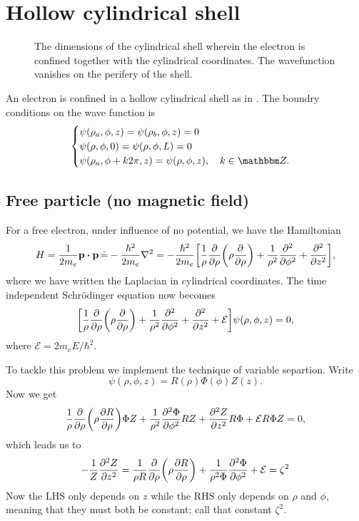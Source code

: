 \documentclass[11pt,letter, swedish, english
]{article}
\begin{document}
\section{Hollow cylindrical shell}
\newcommand{\E}{\ensuremath{\mathcal{E}}}

\begin{figure}\centering
\resizebox{.3\textwidth}{!}{}
\caption{The dimensions of the cylindrical shell wherein the electron
  is confined together with the cylindrical coordinates. The
  wavefunction vanishes on the perifery of the shell.}
\label{fig:cylinder}
\end{figure}

An electron is confined in a hollow cylindrical shell as in
. The boundry conditions on the wave function is
\begin{equation}
\begin{cases}
\psi(\rho_a, \phi, z)=\psi(\rho_b, \phi, z)=0\\
\psi(\rho, \phi, 0)=\psi(\rho, \phi, L)=0\\
\psi(\rho_a, \phi+k2\pi, z)=\psi(\rho, \phi, z)\qcomma k\in\Z.
\end{cases}
\end{equation}

\subsection{Free particle (no magnetic field)}
For a free electron, under influence of no potential, we have the
Hamiltonian 
\begin{equation}
H=\frac{1}{2m_e}\vb{p}\vdot\vb{p} \,\dot{=}-\frac{\hbar^2}{2m_e}\laplacian
=-\frac{\hbar^2}{2m_e}\qty[
\frac{1}{\rho}\pdv{\rho}\qty(\rho\pdv{\rho})
+\frac{1}{\rho^2}\pdv[2]{\phi} + \pdv[2]{z}],
\end{equation}
where we have written the Laplacian in cylindrical coordinates.
The time independent Schrödinger equation now becomes
\begin{equation}\label{eq:5a_SE}
\qty[
\frac{1}{\rho}\pdv{\rho}\qty(\rho\pdv{\rho})
+\frac{1}{\rho^2}\pdv[2]{\phi} + \pdv[2]{z}
+\E]\psi(\rho, \phi, z)=0,
\end{equation}
where $\E=2m_eE/\hbar^2$.

To tackle this problem we implement the technique of variable
separtion. Write
\begin{equation}
\psi(\rho, \phi, z)=R(\rho)\Phi(\phi)Z(z).
\end{equation}
Now we get
\begin{equation}
\frac{1}{\rho}\pdv{\rho}\qty(\rho\pdv{R}{\rho})\Phi Z
+\frac{1}{\rho^2}\pdv[2]{\Phi}{\phi}RZ + 
\pdv[2]{Z}{z}R\Phi
+\E R\Phi Z=0,
\end{equation}
which leads us to
\begin{equation}
-\frac{1}{Z}\pdv[2]{Z}{z}
=\frac{1}{\rho R}\pdv{\rho}\qty(\rho\pdv{R}{\rho})
+\frac{1}{\rho^2\Phi}\pdv[2]{\Phi}{\phi}
+\E = \zeta^2
\end{equation}
Now the LHS only depends on $z$ while the RHS only depends on $\rho$
and $\phi$, meaning that they must both be constant; call that
constant $\zeta^2$. 
\end{document}
